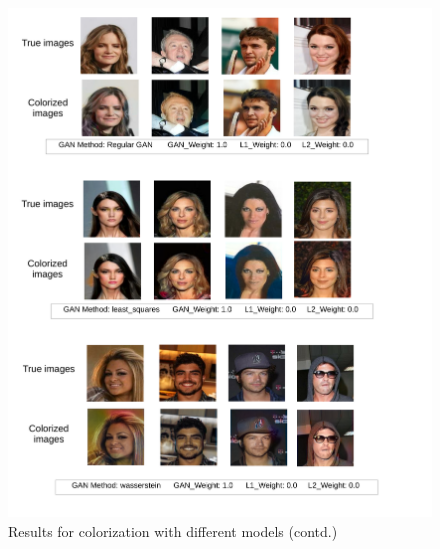 \documentclass[11pt]{article}
\begin{document}
\begin{figure}[t]
\vspace{-10mm}
\hspace{-20mm}
\includegraphics [scale=0.34]{2.pdf}
\vspace{-16mm}
\caption{Results for colorization with different models (contd.)}
\label{fig:2}
\end{figure}
\end{document}
